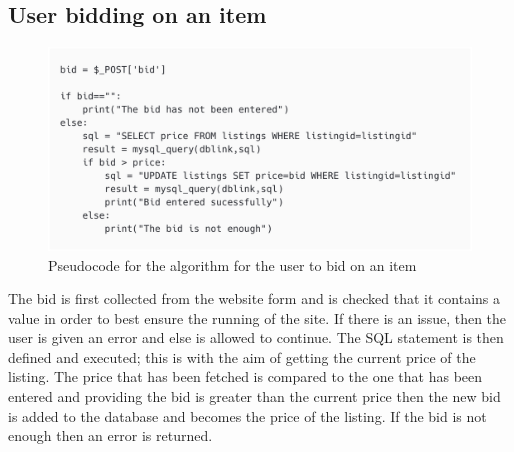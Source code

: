 \subsection{User bidding on an item}
\begin{figure}[H]
    \centering
    \includegraphics[scale=0.3]{ch2_design/alg_bid.png}
    \caption{Pseudocode for the algorithm for the user to bid on an item}
    \label{fig:alg_bid}
\end{figure}
The bid is first collected from the website form and is checked that it contains a value in order to best ensure the running of the site. If there is an issue, then the user is given an error and else is allowed to continue. The SQL statement is then defined and executed; this is with the aim of getting the current price of the listing. The price that has been fetched is compared to the one that has been entered and providing the bid is greater than the current price then the new bid is added to the database and becomes the price of the listing. If the bid is not enough then an error is returned. 
 
